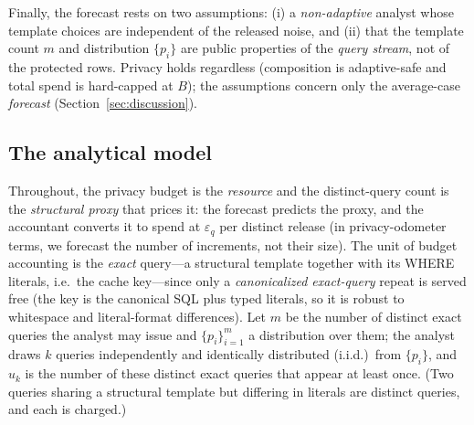 \documentclass[sigconf,nonacm]{acmart}
\newcommand{\eps}{\varepsilon}
\begin{document}
Finally, the forecast rests on two assumptions: (i) a \emph{non-adaptive} analyst whose template choices are independent of the released noise, and (ii) that the template count $m$ and distribution $\{p_i\}$ are public properties of the \emph{query stream}, not of the protected rows. Privacy holds regardless (composition is adaptive-safe and total spend is hard-capped at $B$); the assumptions concern only the average-case \emph{forecast} (Section~\ref{sec:discussion}).

\subsection{The analytical model}
\label{sec:model}

Throughout, the privacy budget is the \emph{resource} and the distinct-query count is the \emph{structural proxy} that prices it: the forecast predicts the proxy, and the accountant converts it to spend at $\eps_q$ per distinct release (in privacy-odometer terms, we forecast the number of increments, not their size). The unit of budget accounting is the \emph{exact} query---a structural template together with its WHERE literals, i.e.\ the cache key---since only a \emph{canonicalized exact-query} repeat is served free (the key is the canonical SQL plus typed literals, so it is robust to whitespace and literal-format differences). Let $m$ be the number of distinct exact queries the analyst may issue and $\{p_i\}_{i=1}^m$ a distribution over them; the analyst draws $k$ queries independently and identically distributed (i.i.d.)\ from $\{p_i\}$, and $u_k$ is the number of these distinct exact queries that appear at least once. (Two queries sharing a structural template but differing in literals are distinct queries, and each is charged.)
\end{document}
